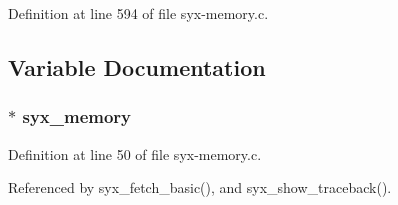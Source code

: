 Definition at line 594 of file syx-memory.c.

\subsection{Variable Documentation}
\hypertarget{syx-memory_8c_e9e3c062a63b7ee6b13ca9e026af87b6}{
\subsubsection{$\ast$ {\bf syx\_\-memory}}}
\label{syx-memory_8c_e9e3c062a63b7ee6b13ca9e026af87b6}




Definition at line 50 of file syx-memory.c.

Referenced by syx\_\-fetch\_\-basic(), and syx\_\-show\_\-traceback().